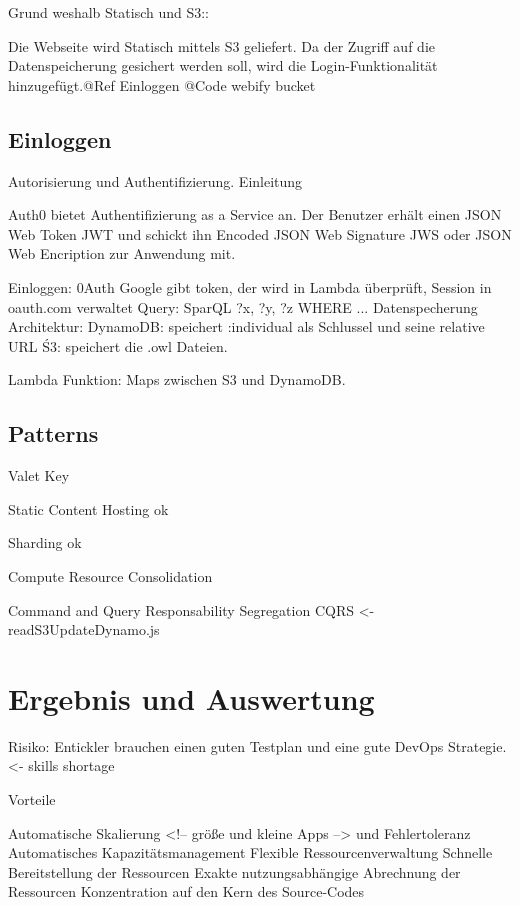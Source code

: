 \documentclass[
12pt,
english,
ngerman,
headsepline,
twoside,
openright,
numbers=noenddot,version=first
]{scrreprt}
\begin{document}
Grund weshalb Statisch und S3:: 

Die Webseite wird Statisch mittels S3 geliefert. Da der Zugriff auf die Datenspeicherung gesichert werden soll, wird die  Login-Funktionalität hinzugefügt.@Ref Einloggen
@Code webify bucket



\section{Einloggen}

Autorisierung und Authentifizierung. Einleitung

Auth0 bietet Authentifizierung as a Service an. Der Benutzer erhält einen JSON Web Token JWT und schickt ihn Encoded JSON Web Signature JWS oder JSON Web Encription zur Anwendung mit.


Einloggen: 0Auth Google gibt token, der wird in Lambda überprüft, Session in oauth.com verwaltet
Query: SparQL ?x, ?y, ?z WHERE ...
Datenspecherung Architektur:
DynamoDB: speichert :individual als Schlussel und seine relative URL
Ś3: speichert die .owl Dateien.

Lambda Funktion: Maps zwischen S3 und DynamoDB.

\section{Patterns}

Valet Key \cite{homer2014cloud}

Static Content Hosting ok

Sharding ok

Compute Resource Consolidation 

Command and Query Responsability Segregation CQRS <- readS3UpdateDynamo.js

\chapter{Ergebnis und Auswertung}
Risiko: 
Entickler brauchen einen guten Testplan und eine gute DevOps Strategie.<- skills shortage

Vorteile

Automatische Skalierung <!-- größe und kleine Apps --> und Fehlertoleranz
Automatisches Kapazitätsmanagement
Flexible Ressourcenverwaltung
Schnelle Bereitstellung der Ressourcen
Exakte nutzungsabhängige Abrechnung der Ressourcen
Konzentration auf den Kern des Source-Codes
\end{document}
